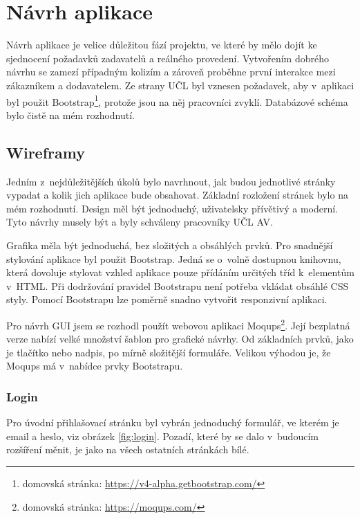 \chapter{Návrh aplikace}
    Návrh aplikace je velice důležitou fází projektu, ve které by mělo dojít ke sjednocení požadavků zadavatelů a reálného provedení. Vytvořením dobrého návrhu se zamezí případným kolizím a zároveň proběhne první interakce mezi zákazníkem a dodavatelem. Ze strany UČL byl vznesen požadavek, aby v~aplikaci byl použit Bootstrap\footnote{domovská stránka: \url{https://v4-alpha.getbootstrap.com/}}, protože jsou na něj pracovníci zvyklí. Databázové schéma bylo čistě na mém rozhodnutí.
    
    \section{Wireframy}

        Jedním z~nejdůležitějších úkolů bylo navrhnout, jak budou jednotlivé stránky vypadat a kolik jich aplikace bude obsahovat. Základní rozložení stránek bylo na mém rozhodnutí. Design měl být jednoduchý, uživatelsky přívětivý a moderní. Tyto návrhy musely být a byly schváleny pracovníky UČL AV.
        
        Grafika měla být jednoduchá, bez složitých a obsáhlých prvků. Pro snadnější stylování aplikace byl použit Bootstrap. Jedná se o~volně dostupnou knihovnu, která dovoluje stylovat vzhled aplikace pouze přídáním určitých tříd k~elementům v~HTML. Při dodržování pravidel Bootstrapu není potřeba vkládat obsáhlé CSS styly. Pomocí Bootstrapu lze poměrně snadno vytvořit responzivní aplikaci.
        
        Pro návrh GUI jsem se rozhodl použít webovou aplikaci Moqups\footnote{domovská stránka: \url{https://moqups.com/}}. Její bezplatná verze nabízí velké množství šablon pro grafické návrhy. Od základních prvků, jako je tlačítko nebo nadpis, po mírně složitější formuláře. Velikou výhodou je, že Moqups má v~nabídce prvky Bootstrapu. 
        
        \subsection{Login}
            Pro úvodní přihlašovací stránku byl vybrán jednoduchý formulář, ve kterém je email a heslo, viz obrázek \ref{fig:login}. Pozadí, které by se dalo v~budoucím rozšíření měnit, je jako na všech ostatních stránkách bílé.
            
